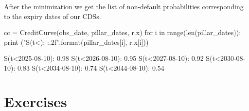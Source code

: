 After the minimization we get the list of non-default probabilities corresponding to the expiry dates of our CDSs.

\begin{ipython}
cc = CreditCurve(obs_date, pillar_dates, r.x)
for i in range(len(pillar_dates)):
    print ("S(t<{}): {:.2f}".format(pillar_dates[i], r.x[i]))
\end{ipython}
\begin{ioutput}
S(t<2025-08-10): 0.98
S(t<2026-08-10): 0.95
S(t<2027-08-10): 0.92
S(t<2030-08-10): 0.83
S(t<2034-08-10): 0.74
S(t<2044-08-10): 0.54
\end{ioutput}

\section*{Exercises}

